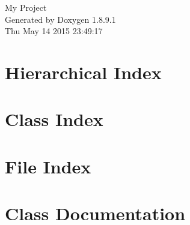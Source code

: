 \documentclass[twoside]{book}
\newcommand{\+}{\discretionary{\mbox{\scriptsize$\hookleftarrow$}}{}{}}
\newcommand{\clearemptydoublepage}{%
  \newpage{\pagestyle{empty}\cleardoublepage}%
}
\begin{document}
\hypersetup{pageanchor=false,
             bookmarks=true,
             bookmarksnumbered=true,
             pdfencoding=unicode
            }
\begin{titlepage}
\vspace*{7cm}
\begin{center}%
{\Large My Project }\\
\vspace*{1cm}
{\large Generated by Doxygen 1.8.9.1}\\
\vspace*{0.5cm}
{\small Thu May 14 2015 23:49:17}\\
\end{center}
\end{titlepage}
\clearemptydoublepage
\tableofcontents
\clearemptydoublepage
{}
\hypersetup{pageanchor=true}

\chapter{Hierarchical Index}

\chapter{Class Index}

\chapter{File Index}

\chapter{Class Documentation}






















\end{document}
